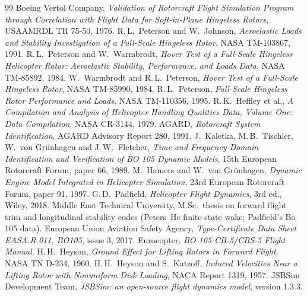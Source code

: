 \documentclass[10pt,a4paper,twocolumn]{article}
\begin{document}
\begin{thebibliography}{99}\small
{} Boeing Vertol Company, \emph{Validation of Rotorcraft Flight Simulation Program through Correlation with Flight Data for Soft-in-Plane Hingeless Rotors}, USAAMRDL TR 75-50, 1976.
 R.\,L.\ Peterson and W.\ Johnson, \emph{Aeroelastic Loads and Stability Investigation of a Full-Scale Hingeless Rotor}, NASA TM-103867, 1991.
 R.\,L.\ Peterson and W.\ Warmbrodt, \emph{Hover Test of a Full-Scale Hingeless Helicopter Rotor: Aeroelastic Stability, Performance, and Loads Data}, NASA TM-85892, 1984.
 W.\ Warmbrodt and R.\,L.\ Peterson, \emph{Hover Test of a Full-Scale Hingeless Rotor}, NASA TM-85990, 1984.
 R.\,L.\ Peterson, \emph{Full-Scale Hingeless Rotor Performance and Loads}, NASA TM-110356, 1995.
 R.\,K.\ Heffley et al., \emph{A Compilation and Analysis of Helicopter Handling Qualities Data, Volume One: Data Compilation}, NASA CR-3144, 1979.
 AGARD, \emph{Rotorcraft System Identification}, AGARD Advisory Report 280, 1991.
 J.\ Kaletka, M.\,B.\ Tischler, W.\ von Gr\"unhagen and J.\,W.\ Fletcher, \emph{Time and Frequency-Domain Identification and Verification of BO 105 Dynamic Models}, 15th European Rotorcraft Forum, paper 66, 1989.
 M.\ Hamers and W.\ von Gr\"unhagen, \emph{Dynamic Engine Model Integrated in Helicopter Simulation}, 23rd European Rotorcraft Forum, paper 91, 1997.
 G.\,D.\ Padfield, \emph{Helicopter Flight Dynamics}, 3rd ed., Wiley, 2018.
 Middle East Technical University, M.Sc.\ thesis on forward flight trim and longitudinal stability codes (Peters--He finite-state wake; Padfield's Bo 105 data).
 European Union Aviation Safety Agency, \emph{Type-Certificate Data Sheet EASA.R.011, BO105}, issue 3, 2017.
 Eurocopter, \emph{BO 105 CB-5/CBS-5 Flight Manual}.
 H.\,H.\ Heyson, \emph{Ground Effect for Lifting Rotors in Forward Flight}, NASA TN D-234, 1960.
 H.\,H.\ Heyson and S.\ Katzoff, \emph{Induced Velocities Near a Lifting Rotor with Nonuniform Disk Loading}, NACA Report 1319, 1957.
 JSBSim Development Team, \emph{JSBSim: an open-source flight dynamics model}, version 1.3.3.
\end{thebibliography}
\end{document}
